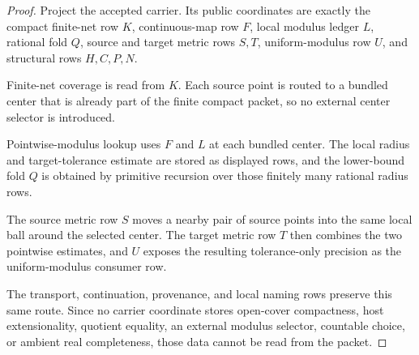 \begin{proof}
Project the accepted carrier. Its public coordinates are exactly the compact finite-net row $K$, continuous-map row $F$, local modulus ledger $L$, rational fold $Q$, source and target metric rows $S,T$, uniform-modulus row $U$, and structural rows $H,C,P,N$.

Finite-net coverage is read from $K$. Each source point is routed to a bundled center that is already part of the finite compact packet, so no external center selector is introduced.

Pointwise-modulus lookup uses $F$ and $L$ at each bundled center. The local radius and target-tolerance estimate are stored as displayed rows, and the lower-bound fold $Q$ is obtained by primitive recursion over those finitely many rational radius rows.

The source metric row $S$ moves a nearby pair of source points into the same local ball around the selected center. The target metric row $T$ then combines the two pointwise estimates, and $U$ exposes the resulting tolerance-only precision as the uniform-modulus consumer row.

The transport, continuation, provenance, and local naming rows preserve this same route. Since no carrier coordinate stores open-cover compactness, host extensionality, quotient equality, an external modulus selector, countable choice, or ambient real completeness, those data cannot be read from the packet.
\end{proof}


